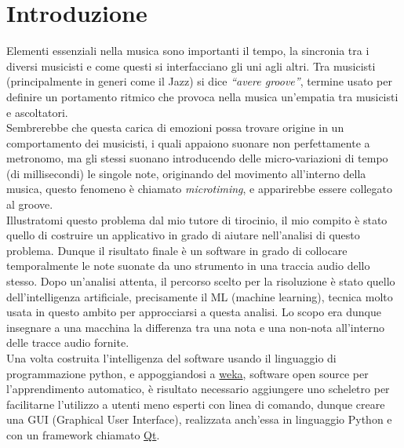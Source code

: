 \chapter*{Introduzione}
\label{cap:introduzione}
\rhead{\thepage}

\pagestyle{plain}
\fancyhf{}
\renewcommand{\headrulewidth}{2pt}
\fancyhead[EL]{\textbf{\textsf{\nouppercase\thepage}}}
\fancyhead[ER]{\textbf{\textsf{\nouppercase\leftmark}}}
\fancyhead[OR]{\textbf{\textsf{\nouppercase\thepage}}}
\fancyhead[OL]{\textbf{\textsf{\nouppercase {\rightmark}}}}

\thispagestyle{empty}

Elementi essenziali nella musica sono importanti il tempo, la sincronia tra i diversi musicisti e come questi si interfacciano gli uni agli altri. Tra musicisti (principalmente in generi come il Jazz) si dice \emph{``avere groove''}, termine usato per definire un portamento ritmico che provoca nella musica un'empatia tra musicisti e ascoltatori\nocite{wiki:groove}.\\
Sembrerebbe che questa carica di emozioni possa trovare origine in un comportamento dei musicisti, i quali appaiono suonare non perfettamente a metronomo, ma gli stessi suonano introducendo delle micro-variazioni di tempo (di millisecondi) le singole note, originando del movimento all'interno della musica, questo fenomeno è chiamato \emph{microtiming}, e apparirebbe essere collegato al groove\nocite{8350302}.\\
Illustratomi questo problema dal mio tutore di tirocinio, il mio compito è stato quello di costruire un applicativo in grado di aiutare nell'analisi di questo problema. Dunque il risultato finale è un software in grado di collocare temporalmente le note suonate da uno strumento in una traccia audio dello stesso. Dopo un'analisi attenta, il percorso scelto per la risoluzione è stato quello dell'intelligenza artificiale, precisamente il ML (machine learning), tecnica molto usata in questo ambito \nocite{Wright06towardsmachine}per approcciarsi a questa analisi. Lo scopo era dunque insegnare a una macchina la differenza tra una nota e una non-nota all'interno delle tracce audio fornite.\\
Una volta costruita l'intelligenza del software usando il linguaggio di programmazione python, e appoggiandosi a \href{https://www.cs.waikato.ac.nz/ml/weka/}{weka}, software open source per l'apprendimento automatico, è risultato necessario aggiungere uno scheletro per facilitarne l'utilizzo a utenti meno esperti con linea di comando, dunque creare una GUI (Graphical User Interface), realizzata anch'essa in linguaggio Python e con un framework chiamato \href{https://www.qt.io/}{Qt}.